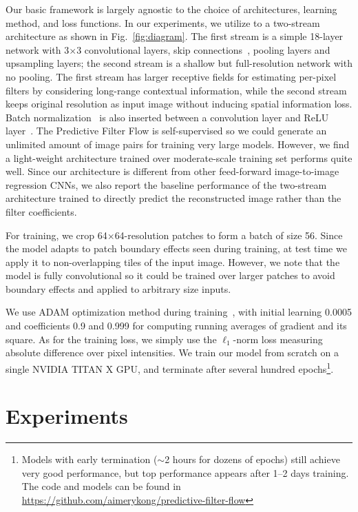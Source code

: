 \documentclass[10pt,twocolumn,letterpaper]{article}
\begin{document}
Our basic framework is largely agnostic to the choice of architectures,
learning method, and loss functions.  In our experiments, we utilize to a
two-stream architecture as shown in Fig.~\ref{fig:diagram}.  The first stream
is a simple 18-layer network with 3$\times$3 convolutional layers, skip
connections~\cite{he2016deep}, pooling layers and upsampling layers; the second
stream is a shallow but full-resolution network with no pooling.
The first stream has larger receptive fields for estimating per-pixel filters
by considering long-range contextual information, while the second stream keeps
original resolution as input image without inducing spatial information loss.
Batch normalization~\cite{ioffe2015batch} is also inserted between a convolution
layer and ReLU layer~\cite{nair2010rectified}.
The Predictive Filter Flow is self-supervised so we could generate an unlimited
amount of image pairs for training very large models. However, we find a light-weight
architecture trained over moderate-scale training set performs quite well.
Since our architecture is different from other feed-forward
image-to-image regression CNNs, we also report the baseline performance of the
two-stream architecture trained to directly predict the reconstructed image
rather than the filter coefficients.

For training, we crop 64$\times$64-resolution patches to form a batch of size
56. Since the model adapts to patch boundary effects seen during training, at
test time we apply it to non-overlapping tiles of the input image.  However, we
note that the model is fully convolutional so it could be trained over larger
patches to avoid boundary effects and applied to arbitrary size inputs.

We use ADAM optimization method during training~\cite{kingma2014adam},
with initial learning 0.0005 and coefficients 0.9 and 0.999
for computing running averages of gradient and its square. As for the training loss,
we simply use the $\ell_1$-norm loss measuring absolute difference over pixel intensities.
We train our model from scratch on a single NVIDIA TITAN X GPU,
and terminate after several hundred epochs\footnote{Models with early
termination ($\sim$2 hours for dozens of epochs) still achieve very good
performance, but top performance appears after 1--2 days training.
The code and models can be found in
\url{https://github.com/aimerykong/predictive-filter-flow}}.




\section{Experiments}
\label{sec:exp}
\end{document}
